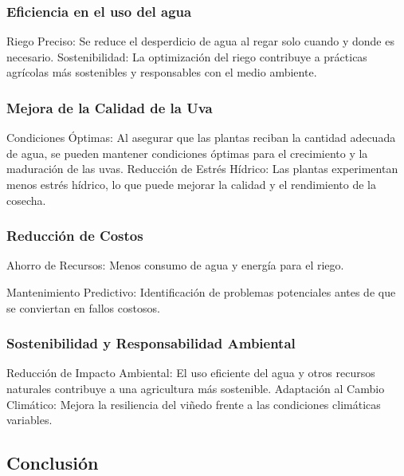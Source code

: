 \documentclass{article}
\begin{document}
\hypertarget{eficiencia-en-el-uso-del-agua}{%
\subsubsection{Eficiencia en el uso del
agua}\label{eficiencia-en-el-uso-del-agua}}

Riego Preciso: Se reduce el desperdicio de agua al regar solo cuando y
donde es necesario. Sostenibilidad: La optimización del riego contribuye
a prácticas agrícolas más sostenibles y responsables con el medio
ambiente.

\hypertarget{mejora-de-la-calidad-de-la-uva}{%
\subsubsection{Mejora de la Calidad de la
Uva}\label{mejora-de-la-calidad-de-la-uva}}

Condiciones Óptimas: Al asegurar que las plantas reciban la cantidad
adecuada de agua, se pueden mantener condiciones óptimas para el
crecimiento y la maduración de las uvas. Reducción de Estrés Hídrico:
Las plantas experimentan menos estrés hídrico, lo que puede mejorar la
calidad y el rendimiento de la cosecha.

\hypertarget{reducciuxf3n-de-costos}{%
\subsubsection{Reducción de Costos}\label{reducciuxf3n-de-costos}}

Ahorro de Recursos: Menos consumo de agua y energía para el riego.

Mantenimiento Predictivo: Identificación de problemas potenciales antes
de que se conviertan en fallos costosos.

\hypertarget{sostenibilidad-y-responsabilidad-ambiental}{%
\subsubsection{Sostenibilidad y Responsabilidad
Ambiental}\label{sostenibilidad-y-responsabilidad-ambiental}}

Reducción de Impacto Ambiental: El uso eficiente del agua y otros
recursos naturales contribuye a una agricultura más sostenible.
Adaptación al Cambio Climático: Mejora la resiliencia del viñedo frente
a las condiciones climáticas variables.

\hypertarget{conclusiuxf3n}{%
\subsection{Conclusión}\label{conclusiuxf3n}}
\end{document}
